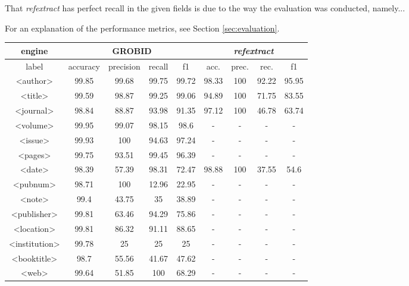 That \emph{refextract} has perfect recall in the given fields is due to the way the evaluation was conducted, namely...

For an explanation of the performance metrics, see Section \ref{sec:evaluation}.

\begin{table}[h]
\begin{center}
\begin{tabular}{|c|cccc|cccc|}
\hline
engine &  \multicolumn{4}{c|}{GROBID} & \multicolumn{4}{c|}{\emph{refextract}}\\
\hline
label & accuracy & precision & recall & f1 & acc. & prec. & rec. & f1\\
\hline
<author>    & 99.85 &   99.68   &   99.75   &   99.72   & 98.33 &   100 &   92.22   &   95.95   \\
<title> &   99.59   &   98.87   &   99.25   &   99.06   & 94.89 &   100 &   71.75   &   83.55   \\
<journal>   & 98.84 &   88.87   &   93.98   &   91.35   & 97.12 &   100 &   46.78   &   63.74   \\
<volume>&   99.95   &   99.07   &   98.15   &   98.6    & -     &   -   &   -       &   -   \\
<issue> &   99.93   &   100     &   94.63   &   97.24   & -     &   -   &   -       &   -   \\
<pages> &   99.75   &   93.51   &   99.45   &   96.39   & -     &   -   &   -       &   -   \\
<date>  &   98.39   &   57.39   &   98.31   &   72.47   & 98.88 &   100 &   37.55   &   54.6    \\
<pubnum>&   98.71   &   100     &   12.96   &   22.95   & -     &   -   &   -       &   -   \\
<note>  &   99.4    &   43.75   &   35      &   38.89   & -     &   -   &   -       &   -   \\
<publisher>&99.81   &   63.46   &   94.29   &   75.86   & -     &   -   &   -       &   -   \\
<location>& 99.81   &   86.32   &   91.11   &   88.65   & -     &   -   &   -       &   -   \\
<institution>& 99.78&   25      &   25      &   25      & -     &   -   &   -       &   -   \\
<booktitle>&    98.7&   55.56   &   41.67   &   47.62   & -     &   -   &   -       &   -   \\
<web>   &   99.64   &   51.85   &   100     &   68.29   & -     &   -   &   -       &   -   \\

\end{tabular}
\end{center}
\end{table}
